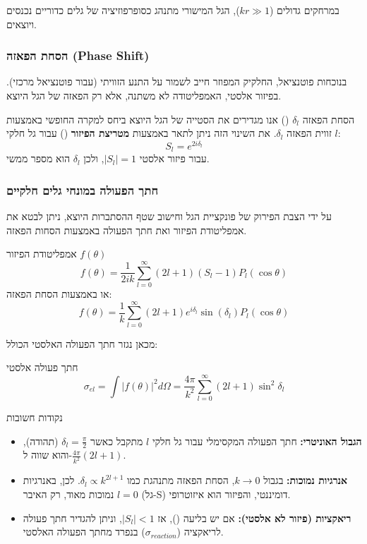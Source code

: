 במרחקים גדולים ($kr \gg 1$), הגל המישורי מתנהג כסופרפוזיציה של גלים כדוריים נכנסים ויוצאים.

\subsubsection{הסחת הפאזה (Phase Shift)}
בנוכחות פוטנציאל, החלקיק המפוזר חייב לשמור על התנע הזוויתי (עבור פוטנציאל מרכזי). בפיזור אלסטי, האמפליטודה לא משתנה, אלא רק הפאזה של הגל היוצא.

\begin{definitionbox}{הסחת הפאזה $\delta_l$ ()}
אנו מגדירים את הסטייה של הגל היוצא ביחס למקרה החופשי באמצעות זווית הפאזה $\delta_l$.
את השינוי הזה ניתן לתאר באמצעות \textbf{מטריצת הפיזור} () עבור גל חלקי $l$:
\[
S_l = e^{2i\delta_l}
\]
עבור פיזור אלסטי $|S_l|=1$, ולכן $\delta_l$ הוא מספר ממשי.
\end{definitionbox}

\subsubsection{חתך הפעולה במונחי גלים חלקיים}

על ידי הצבת הפירוק של פונקציית הגל וחישוב שטף ההסתברות היוצא, ניתן לבטא את אמפליטודת הפיזור ואת חתך הפעולה באמצעות הסחות הפאזה.

\begin{resultbox}{אמפליטודת הפיזור $f(\theta)$}
\[
f(\theta) = \frac{1}{2ik} \sum_{l=0}^{\infty} (2l+1) (S_l - 1) P_l(\cos\theta)
\]
או באמצעות הסחת הפאזה:
\[
f(\theta) = \frac{1}{k} \sum_{l=0}^{\infty} (2l+1) e^{i\delta_l} \sin(\delta_l) P_l(\cos\theta)
\]
\end{resultbox}

מכאן נגזר חתך הפעולה האלסטי הכולל:

\begin{formulabox}{חתך פעולה אלסטי}
\[
\sigma_{el} = \int |f(\theta)|^2 d\Omega = \frac{4\pi}{k^2} \sum_{l=0}^{\infty} (2l+1) \sin^2 \delta_l
\]
\end{formulabox}

\begin{summarybox}{נקודות חשובות}
\begin{itemize}
    \item \textbf{הגבול האוניטרי:} חתך הפעולה המקסימלי עבור גל חלקי $l$ מתקבל כאשר $\delta_l = \frac{\pi}{2}$ (תהודה), והוא שווה ל-$\frac{4\pi}{k^2}(2l+1)$.
    \item \textbf{אנרגיות נמוכות:} בגבול $k \to 0$, הסחת הפאזה מתנהגת כמו $\delta_l \propto k^{2l+1}$. לכן, באנרגיות נמוכות מאוד, רק האיבר $l=0$ (גל-S) דומיננטי, והפיזור הוא איזוטרופי.
    \item \textbf{ריאקציות (פיזור לא אלסטי):} אם יש בליעה (), אז $|S_l| < 1$, וניתן להגדיר חתך פעולה לריאקציה ($\sigma_{reaction}$) בנפרד מחתך הפעולה האלסטי.
\end{itemize}
\end{summarybox}

